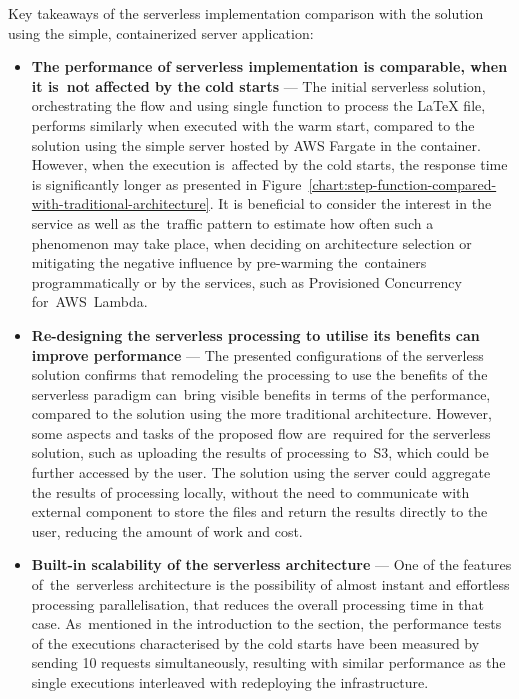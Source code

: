 Key takeaways of the serverless implementation comparison with the solution using the simple, containerized server application:

\begin{itemize}
    \item \textbf{The performance of serverless implementation is comparable, when it is~not affected by the cold starts} --- The initial serverless solution, orchestrating the flow and using single function to process the LaTeX file, performs similarly when executed with the warm start, compared to the solution using the simple server hosted by AWS Fargate in the container. However, when the execution is~affected by the cold starts, the response time is significantly longer as presented in Figure~\ref{chart:step-function-compared-with-traditional-architecture}.
    It is beneficial to consider the interest in the service as well as the~traffic pattern to estimate how often such a phenomenon may take place, when deciding on architecture selection or mitigating the negative influence by pre-warming the~containers programmatically or by the services, such as Provisioned Concurrency for~AWS~Lambda.
    \item \textbf{Re-designing the serverless processing to utilise its benefits can improve performance} --- The presented configurations of the serverless solution confirms that remodeling the processing to use the benefits of the serverless paradigm can~bring visible benefits in terms of the performance, compared to the solution using the more traditional architecture.
    However, some aspects and tasks of the proposed flow are~required for the serverless solution, such as uploading the results of processing to~S3, which could be further accessed by the user.
    The solution using the server could aggregate the results of processing locally, without the need to communicate with external component to store the files and return the results directly to the user, reducing the amount of work and cost.
    \item \textbf{Built-in scalability of the serverless architecture} --- One of the features of~the~serverless architecture is the possibility of almost instant and effortless processing parallelisation, that reduces the overall processing time in that case.
    As~mentioned in the introduction to the section, the performance tests of the executions characterised by the cold starts have been measured by sending 10 requests simultaneously, resulting with similar performance as the single executions interleaved with redeploying the infrastructure. 

\end{itemize}
